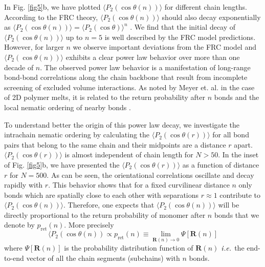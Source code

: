 \documentclass[pre,showpacs,notitlepage,twocolumn]{revtex4-1}
\newcommand{\bR}{\mathbf{R}}
\begin{document}
   In Fig. \ref{fig5}b, we have plotted  $\langle P_2( \cos \theta(n)) \rangle$ for different chain lengths. According to the FRC theory, $\langle P_2( \cos \theta(n)) \rangle$ should also decay exponentially as 
   $ \langle P_2( \cos \theta(n)) \rangle= \langle P_2( \cos \theta) \rangle^n$ \cite{Porod1953}.
   We find that the initial decay of $ \langle P_2( \cos \theta(n)) \rangle$ up to $n=5$ is well described by the FRC model predictions. However, for larger $n$ we observe important deviations from the  FRC  model and 
   $ \langle P_2( \cos \theta(n)) \rangle$    exhibits a clear power law behavior over more than one decade of $n$.   
   The observed power law behavior is a manifestation of long-range bond-bond correlations along the chain backbone that result from incomplete screening of excluded volume interactions. 
 As noted by Meyer et. al. in the case of 2D polymer melts, it is related to  the return probability after $n$ bonds  and the local nematic ordering of nearby bonds \cite{Meyer2010}.   
   
   
   To understand better the origin of this power law decay, we investigate the intrachain nematic ordering by calculating the $ \langle P_2( \cos \theta(r)) \rangle$ for all bond pairs that belong to the same chain and their midpoints
   are a distance $r$ apart.  $ \langle P_2( \cos \theta(r)) \rangle$  is almost  independent of chain length for $N>50$.  In the  inset of Fig. \ref{fig5}b, we have presented the $ \langle P_2( \cos \theta(r)) \rangle$ as a function of
   distance $r$  for $N=500$.  As can be seen, the orientational correlations oscillate and decay rapidly with $r$. This behavior shows that for a fixed curvilinear distance $n$ only  bonds which are spatially close to each other
    with separations  $r \approx 1$  contribute to $ \langle P_2( \cos \theta(n)) \rangle$. Therefore, one expects that $ \langle P_2( \cos \theta(n)) \rangle$ will be directly proportional to the return probability of monomer after  $n$ bonds
    \cite{Meyer2010}  that we denote by  $p_{\mathrm{ret}}(n)$. More precisely
        \begin{equation}
\langle P_2( \cos \theta(n)) \propto p_{\mathrm{ret}}(n) \equiv \lim_{\bR(n) \rightarrow 0} \Psi [\bR(n)] 
\label{eq:P_r(n)}
\end{equation}
   where  $\Psi [\bR(n)]$ is the probability distribution  function  of  $\bR(n)$ $\it{i. e.}$  the end-to-end vector  of all the chain segments (subchains) with  $n$ bonds.
   
\end{document}
